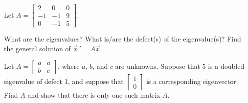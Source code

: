 \begin{exercise}
Let $A =
\left[ \begin{smallmatrix}
2 & 0 & 0 \\
-1 & -1 & 9 \\
0 & -1 & 5
\end{smallmatrix}\right]$.  
\begin{tasks}
\task What are the eigenvalues?
\task What is/are the defect(s) of the eigenvalue(s)?
\task Find the general solution of $\vec{x}\,' = A\vec{x}$.
\end{tasks}
\end{exercise}

\begin{exercise}
Let $A =
\left[ \begin{smallmatrix}
a & a \\
b & c
\end{smallmatrix}\right]$, where $a$, $b$, and $c$ are unknowns.
Suppose that $5$ is a doubled eigenvalue of defect 1, and suppose that
$\left[ \begin{smallmatrix}
1 \\ 0
\end{smallmatrix}\right]$ is a corresponding eigenvector.  Find $A$ and show that
there is only one such matrix $A$.
\end{exercise}

